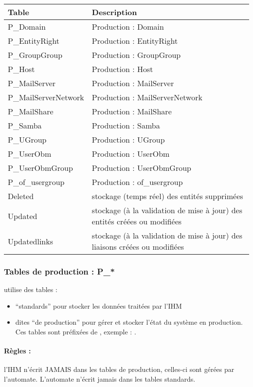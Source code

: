 \begin{tabular}{|p{5cm}|p{8cm}|}
\hline
\textbf{Table} & \textbf{Description} \\
\hline
P\_Domain & Production : Domain \\
\hline
P\_EntityRight & Production : EntityRight \\
\hline
P\_GroupGroup & Production : GroupGroup \\
\hline
P\_Host & Production : Host \\
\hline
P\_MailServer & Production : MailServer \\
\hline
P\_MailServerNetwork & Production : MailServerNetwork \\
\hline
P\_MailShare & Production : MailShare \\
\hline
P\_Samba & Production : Samba \\
\hline
P\_UGroup & Production : UGroup \\
\hline
P\_UserObm & Production : UserObm \\
\hline
P\_UserObmGroup & Production : UserObmGroup \\
\hline
P\_of\_usergroup & Production : of\_usergroup \\
\hline
\hline
Deleted & stockage (temps réel) des entités supprimées \\
\hline
Updated & stockage (à la validation de mise à jour) des entités créées ou modifiées \\
\hline
Updatedlinks & stockage (à la validation de mise à jour) des liaisons créées ou modifiées \\
\hline
\end{tabular}


\subsubsection{Tables de production : P\_*}

\obm utilise des tables :\\
\begin{itemize}
\item ``standards'' pour stocker les données traitées par l'IHM
\item dites ``de production'' pour gérer et stocker l'état du système en production. Ces tables sont préfixées de , exemple : . 
\end{itemize}

\paragraph{Règles :} l'IHM n'écrit JAMAIS dans les tables de production, celles-ci sont gérées par l'automate. L'automate n'écrit jamais dans les tables standards.


